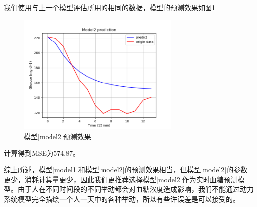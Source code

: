     我们使用与上一个模型评估所用的相同的数据，模型的预测效果如图\ref{fig:predict}
    \begin{figure}[H]
        \centering
        \includegraphics[width=0.7\textwidth]{Img/predict.png}
        \caption{模型\ref{model2}预测效果}
        \label{fig:predict}
    \end{figure}

    计算得到MSE为$574.87$。

    综上所述，模型\ref{model1}和模型\ref{model2}的预测效果相当，但模型\ref{model2}的参数更少，消耗计算量更少，因此我们更推荐选择模型\ref{model2}作为实时血糖预测模型。由于人在不同时间段的不同举动都会对血糖浓度造成影响，我们不能通过动力系统模型完全描绘一个人一天中的各种举动，所以有些许误差是可以接受的。

    
